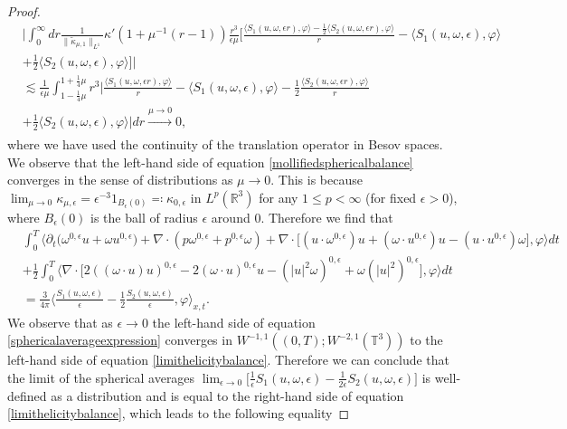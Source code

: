 \documentclass[10pt,a4paper]{amsart}
\begin{document}
\begin{proof}
\begin{align*}
&\bigg\lvert \int_0^\infty dr \frac{1}{\lVert \widetilde{\kappa}_{\mu,1} \rVert_{L^1}} \kappa' ( 1 + \mu^{-1} (r -1) ) \frac{r^3}{\epsilon \mu} \bigg[ \frac{\langle S_1 (u,\omega, \epsilon r), \varphi \rangle - \frac{1}{2} \langle S_2 (u,\omega, \epsilon r), \varphi \rangle}{r} - \langle S_1 (u,\omega, \epsilon ), \varphi \rangle \\
&+ \frac{1}{2} \langle S_2 (u,\omega, \epsilon ), \varphi \rangle \bigg] \bigg\rvert \\
&\lesssim \frac{1}{\epsilon \mu} \int_{1 - \frac{1}{4} \mu}^{1 + \frac{1}{4} \mu} r^3 \bigg\lvert \frac{\langle S_1 (u,\omega, \epsilon r), \varphi \rangle}{r} - \langle S_1 (u,\omega, \epsilon), \varphi \rangle - \frac{1}{2} \frac{\langle S_2 (u,\omega, \epsilon r), \varphi \rangle}{r} \\
&+ \frac{1}{2} \langle S_2 (u,\omega, \epsilon), \varphi \rangle \bigg\rvert dr \xrightarrow[]{\mu \rightarrow 0} 0,
\end{align*}
where we have used the continuity of the translation operator in Besov spaces. We observe that the left-hand side of equation \eqref{mollifiedsphericalbalance} converges in the sense of distributions as $\mu \rightarrow 0$. This is because $\lim_{\mu \rightarrow 0} \kappa_{\mu,\epsilon} = \epsilon^{-3} 1_{B_\epsilon (0)} \eqqcolon \kappa_{0,\epsilon}$ in $L^p (\mathbb{R}^3)$ for any $1 \leq p < \infty$ (for fixed $\epsilon > 0$), where $B_\epsilon (0)$ is the ball of radius $\epsilon$ around $0$. Therefore we find that
\begin{align}
&\int_0^T \bigg\langle \partial_t \big( \omega^{0,\epsilon} u + \omega u^{0,\epsilon} \big) + \nabla \cdot (p \omega^{0,\epsilon} + p^{0,\epsilon} \omega) + \nabla \cdot \big[ (u \cdot \omega^{0,\epsilon}) u + (\omega \cdot u^{0,\epsilon}) u - (u \cdot u^{0,\epsilon}) \omega \big], \varphi \bigg\rangle dt \nonumber \\
&+ \frac{1}{2} \int_0^T \bigg\langle \nabla \cdot \big[ 2((\omega \cdot u) u)^{0,\epsilon} - 2(\omega \cdot u)^{0,\epsilon} u - ( \lvert u \rvert^2 \omega)^{0,\epsilon} + \omega (\lvert u \rvert^2)^{0,\epsilon} \big], \varphi \bigg\rangle dt \nonumber \\
&= \frac{3}{4 \pi} \bigg\langle \frac{S_1 (u,\omega,\epsilon)}{\epsilon} - \frac{1}{2} \frac{S_2 (u,\omega,\epsilon)}{\epsilon} , \varphi \bigg\rangle_{x,t}. \label{sphericalaverageexpression}
\end{align}
We observe that as $\epsilon \rightarrow 0$ the left-hand side of equation \eqref{sphericalaverageexpression} converges in $W^{-1,1} ((0,T); W^{-2,1} (\mathbb{T}^3))$ to the left-hand side of equation \eqref{limithelicitybalance}. Therefore we can conclude that the limit of the spherical averages $\lim_{\epsilon \rightarrow 0} \bigg[ \frac{1}{\epsilon} S_1 (u,\omega,\epsilon) - \frac{1}{2 \epsilon} S_2 (u,\omega,\epsilon) \bigg]$ is well-defined as a distribution and is equal to the right-hand side of equation \eqref{limithelicitybalance}, which leads to the following equality

\end{proof}
\end{document}
